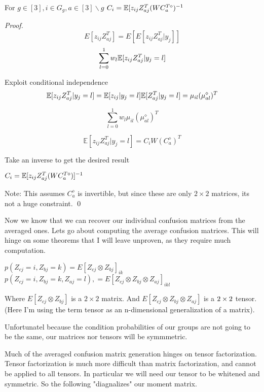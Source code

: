 \begin{lemma}
For $g \in [3], i \in G_{g}, a \in [3]\backslash{g}$
$C_{i} = \mathbb{E}[z_{ij}Z^{T}_{aj}(WC^{T{\diamond}}_{a})^{-1}$
\begin{proof}
$$ E[z_{ij}Z^{T}_{aj}] = E[E[z_{ij}Z^{T}_{aj}| y_{j}]] $$
$$ \displaystyle\sum\limits_{l = 0}^{1} w_{l}\mathbb{E}[z_{ij}Z^{T}_{aj} | y_{j} = l]$$

Exploit conditional independence
$$ \mathbb{E}[z_{ij}Z^{T}_{aj} | y_{j} = l] =  \mathbb{E}[z_{ij} | y_{j} = l] \mathbb{E}[Z^{T}_{aj} | y_{j} = l] = \mu_{il}(\mu^{\diamond}_{al})^{T} $$


$$ \displaystyle\sum\limits_{l = 0}^{1} w_{l}\mu_{il}(\mu^{\diamond}_{al})^{T}$$

$$\mathbb{E}[z_{ij}Z^{T}_{aj} | y_{j} = l] =  C_{i}W(C^{\diamond}_{a})^{T} $$

Take an inverse to get the desired result

$C_{i} = \mathbb{E}[z_{ij}Z^{T}_{aj}(WC^{T\diamond}_{a})]^{-1}$

Note: This assumes $C^{\diamond}_{a}$ is invertible, but since these are only $2 \times 2$ matrices, its not a huge constraint.
\qed
\end{proof}
\end{lemma}

Now we know that we can recover our individual confusion matrices from the averaged ones. Lets go about computing the average confusion matrices. This will hinge on some theorems that I will leave unproven, as they require much computation.

\begin{lemma}
$p(Z_{cj} = i, Z_{bj} = k) = E[Z_{cj} \otimes Z_{bj}]_{ik}$
$p(Z_{cj} = i, Z_{bj} = k, Z_{aj} = l),  = E[Z_{cj} \otimes Z_{bj} \otimes Z_{aj}]_{ikl}$

Where $E[Z_{cj} \otimes Z_{bj}]$ is a $2 \times 2$ matrix. And $E[Z_{cj} \otimes Z_{bj} \otimes Z_{aj}]$ is a $2 \time 2 \times 2$ tensor. (Here I'm using the term tensor as an n-dimensional generalization of a matrix).
\end{lemma}

Unfortunatel because the condition probabilities of our groups are not going to be the same, our matrices nor tensors will be symmmetric.

Much of the averaged confusion matrix generation hinges on tensor factorization. Tensor factorization is much more difficult than matrix factorization, and cannot be applied to all tensors. In particular we will need our tensor to be whitened and symmetric. So the following "diagnalizes" our moment matrix.




